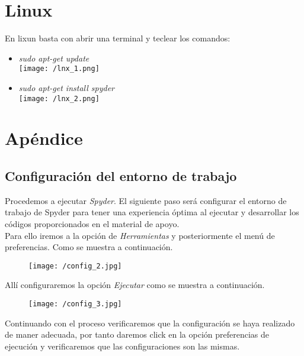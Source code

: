 \documentclass[a4paper, openright, 12pt]{article}
\begin{document}
\newpage{}
\newpage{}



  \section{Linux}
    En lixun basta con abrir una terminal y teclear los comandos:\\
    \begin{itemize}
      \item{\textit{sudo apt-get update}}\\
        \texttt{[image: /lnx\_1.png]}
      \item{\textit{sudo apt-get install spyder}}\\
        \texttt{[image: /lnx\_2.png]}
    \end{itemize}
  \newpage{}





  \section*{Apéndice}
    \subsection*{Configuración del entorno de trabajo}

      Procedemos a ejecutar \textit{Spyder}. El siguiente paso será configurar el entorno de trabajo de Spyder para tener una experiencia óptima al ejecutar y desarrollar los códigos proporcionados en el material de apoyo.\\

      Para ello iremos a la opción de \textit{Herramientas} y posteriormente el menú de preferencias. Como se muestra a continuación.\\
      \begin{figure}[ht]
        \centering
        \texttt{[image: /config\_2.jpg]}
      \end{figure}

      Allí configuraremos la opción \textit{Ejecutar} como se muestra a continuación.
      \begin{figure}[ht]
        \centering
        \texttt{[image: /config\_3.jpg]}
      \end{figure}

      Continuando con el proceso verificaremos que la configuración se haya realizado de maner adecuada, por tanto daremos click en la opción preferencias de ejecución y verificaremos que las configuraciones son las mismas.
\end{document}
